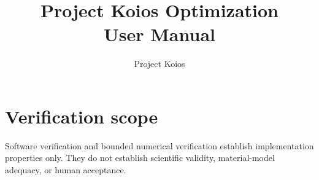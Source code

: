 \documentclass[11pt,oneside]{book}
\begin{document}
\frontmatter
\hypersetup{pageanchor=false}
\title{Project Koios Optimization\\User Manual}
\author{Project Koios}
\date{}
\maketitle
\hypersetup{pageanchor=true}
\tableofcontents
\mainmatter





\backmatter

\chapter*{Verification scope}
Software verification and bounded numerical verification establish implementation
properties only. They do not establish scientific validity, material-model adequacy, or
human acceptance.
\end{document}
